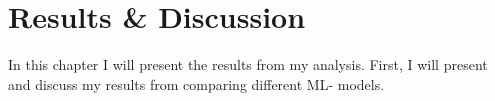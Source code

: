 \chapter{Results \& Discussion}\label{subsec:ResDisc}
In this chapter I will present the results from my analysis. First,
I will present and discuss my results from comparing different \ac{ML}-
models. 

